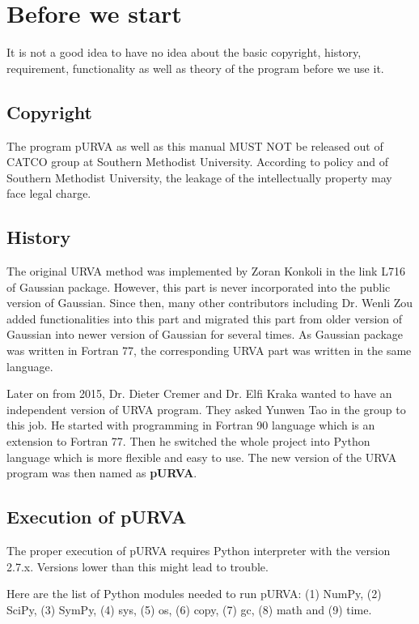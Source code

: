 
\chapter{Before we start}

It is not a good idea to have no idea about the basic copyright, history, requirement, functionality as well as theory of the program before we use it.

\section{Copyright}

The program pURVA as well as this manual MUST NOT be released out of CATCO group at Southern Methodist University. According to policy  and  of Southern Methodist University, the leakage of the intellectually property may face legal charge.

\section{History}

The original URVA method was implemented by Zoran Konkoli in the link L716 of Gaussian package. However, this part is never incorporated into the public version of Gaussian. Since then, many other contributors including Dr. Wenli Zou added functionalities into this part and migrated this part from older version of Gaussian into newer version of Gaussian for several times. As Gaussian package was written in Fortran 77, the corresponding URVA part was written in the same language.

Later on from 2015, Dr. Dieter Cremer and Dr. Elfi Kraka wanted to have an independent version of URVA program. They asked Yunwen Tao in the group to this job. He started with programming in Fortran 90 language which is an extension to Fortran 77. Then he switched the whole project into Python language which is more flexible and easy to use. The new version of the URVA program was then named as \textbf{pURVA}. 



\section{Execution of pURVA }
The proper execution of pURVA requires Python interpreter with the version 2.7.x. Versions lower than this might lead to trouble.

Here are the list of Python modules needed to run pURVA: (1) NumPy, (2) SciPy, (3) SymPy, (4) sys, (5) os, (6) copy,  (7) gc, (8) math and (9) time.

